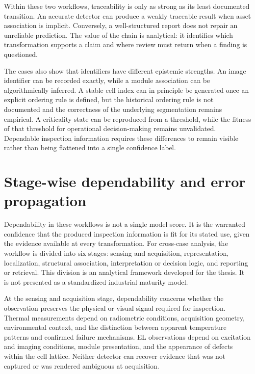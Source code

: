 \documentclass[12pt,a4paper]{report}
\begin{document}
Within these two workflows, traceability is only as strong as its least documented transition. An accurate detector can produce a weakly traceable result when asset association is implicit. Conversely, a well-structured report does not repair an unreliable prediction. The value of the chain is analytical: it identifies which transformation supports a claim and where review must return when a finding is questioned.

The cases also show that identifiers have different epistemic strengths. An image identifier can be recorded exactly, while a module association can be algorithmically inferred. A stable cell index can in principle be generated once an explicit ordering rule is defined, but the historical ordering rule is not documented and the correctness of the underlying segmentation remains empirical. A criticality state can be reproduced from a threshold, while the fitness of that threshold for operational decision-making remains unvalidated. Dependable inspection information requires these differences to remain visible rather than being flattened into a single confidence label.

\section{Stage-wise dependability and error propagation}
\label{sec:ch07-dependability}

Dependability in these workflows is not a single model score. It is the warranted confidence that the produced inspection information is fit for its stated use, given the evidence available at every transformation. For cross-case analysis, the workflow is divided into six stages: sensing and acquisition, representation, localization, structural association, interpretation or decision logic, and reporting or retrieval. This division is an analytical framework developed for the thesis. It is not presented as a standardized industrial maturity model.

At the sensing and acquisition stage, dependability concerns whether the observation preserves the physical or visual signal required for inspection. Thermal measurements depend on radiometric conditions, acquisition geometry, environmental context, and the distinction between apparent temperature patterns and confirmed failure mechanisms. EL observations depend on excitation and imaging conditions, module presentation, and the appearance of defects within the cell lattice. Neither detector can recover evidence that was not captured or was rendered ambiguous at acquisition.
\end{document}
